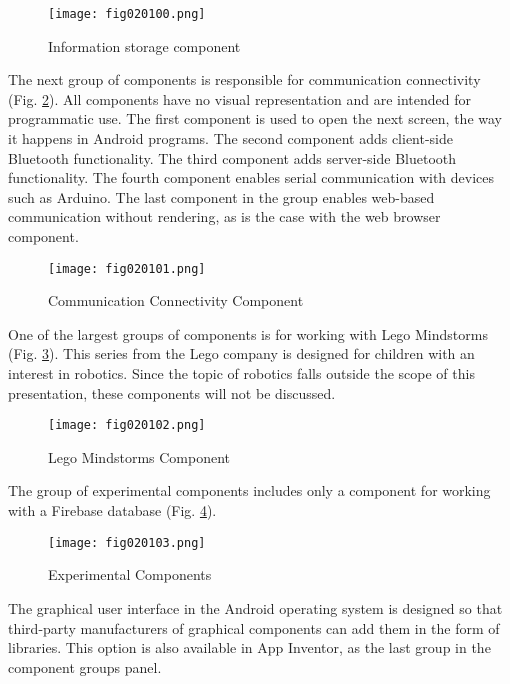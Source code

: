 \begin{figure}[H]
   \centering
   \texttt{[image: fig020100.png]}
   \caption{Information storage component}
\label{fig020100}
\end{figure}

The next group of components is responsible for communication connectivity (Fig. \ref{fig020101}). All components have no visual representation and are intended for programmatic use. The first component is used to open the next screen, the way it happens in Android programs. The second component adds client-side Bluetooth functionality. The third component adds server-side Bluetooth functionality. The fourth component enables serial communication with devices such as Arduino. The last component in the group enables web-based communication without rendering, as is the case with the web browser component.

\begin{figure}[H]
   \centering
   \texttt{[image: fig020101.png]}
   \caption{Communication Connectivity Component}
\label{fig020101}
\end{figure}

One of the largest groups of components is for working with Lego Mindstorms (Fig. \ref{fig020102}). This series from the Lego company is designed for children with an interest in robotics. Since the topic of robotics falls outside the scope of this presentation, these components will not be discussed.

\begin{figure}[H]
   \centering
   \texttt{[image: fig020102.png]}
   \caption{Lego Mindstorms Component}
\label{fig020102}
\end{figure}

The group of experimental components includes only a component for working with a Firebase database (Fig. \ref{fig020103}).

\begin{figure}[H]
   \centering
   \texttt{[image: fig020103.png]}
   \caption{Experimental Components}
\label{fig020103}
\end{figure}

The graphical user interface in the Android operating system is designed so that third-party manufacturers of graphical components can add them in the form of libraries. This option is also available in App Inventor, as the last group in the component groups panel.

